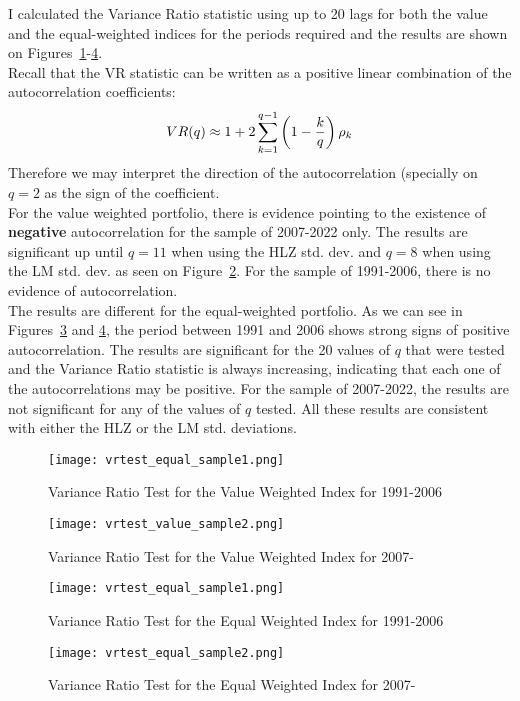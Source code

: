 \begin{solution}
    I calculated the Variance Ratio statistic using up to 20 lags for both the value and the equal-weighted indices for the periods required and the results are shown on Figures~\ref{fig:vrtest_value_sample1}-\ref{fig:vrtest_equal_sample2}. \\
    Recall that the VR statistic can be written as a positive linear combination of the autocorrelation coefficients:
    \[
        VR{\left( q \right)} \approx 1 + 2\sum_{k=1}^{q-1} \left( 1-\frac{k}{q} \right) \rho_k
    \]
    Therefore we may interpret the direction of the autocorrelation (specially on \(q=2\) as the sign of the coefficient. \\
    For the value weighted portfolio, there is evidence pointing to the existence of \textbf{negative} autocorrelation for the sample of 2007-2022 only. The results are significant up until \(q = 11\) when using the HLZ std. dev. and \(q=8\) when using the LM std. dev. as seen on Figure~\ref{fig:vrtest_value_sample2}. For the sample of 1991-2006, there is no evidence of autocorrelation. \\
    The results are different for the equal-weighted portfolio. As we can see in Figures~\ref{fig:vrtest_equal_sample1} and \ref{fig:vrtest_equal_sample2}, the period between 1991 and 2006 shows strong signs of positive autocorrelation. The results are significant for the 20 values of \(q\) that were tested and the Variance Ratio statistic is always increasing, indicating that each one of the autocorrelations may be positive. For the sample of 2007-2022, the results are not significant for any of the values of \(q\) tested. All these results are consistent with either the HLZ or the LM std. deviations.\\
    \begin{figure}[!htbp]
        \centering
        \caption{Variance Ratio Test for the Value Weighted Index for 1991-2006}
        \label{fig:vrtest_value_sample1}
        \texttt{[image: vrtest\_equal\_sample1.png]}
    \end{figure}
    \begin{figure}[!htbp]
        \centering
        \caption{Variance Ratio Test for the Value Weighted Index for 2007-}
        \label{fig:vrtest_value_sample2}
        \texttt{[image: vrtest\_value\_sample2.png]}
    \end{figure}
    \begin{figure}[!htbp]
        \centering
        \caption{Variance Ratio Test for the Equal Weighted Index for 1991-2006}
        \label{fig:vrtest_equal_sample1}
        \texttt{[image: vrtest\_equal\_sample1.png]}
    \end{figure}
    \begin{figure}[!htbp]
        \centering
        \caption{Variance Ratio Test for the Equal Weighted Index for 2007-}
        \label{fig:vrtest_equal_sample2}
        \texttt{[image: vrtest\_equal\_sample2.png]}
    \end{figure}
\end{solution} 
